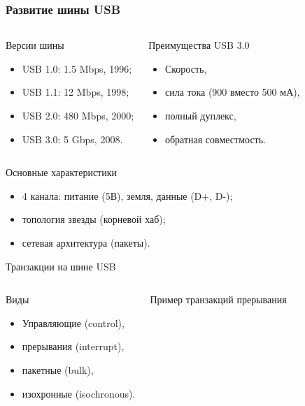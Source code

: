 \begin{frame}
\frametitle{Развитие шины USB}

\begin{columns}
    \column{5cm}

    \begin{block}{Версии шины}
    \begin{itemize}
        \item USB 1.0: 1.5 Mbps, 1996;
        \item USB 1.1: 12 Mbps, 1998;
        \item USB 2.0: 480 Mbps, 2000;
        \item USB 3.0: 5 Gbps, 2008.
    \end{itemize}
    \end{block}

    \column{6cm}
    \pause
    \begin{block}{Преимущества USB 3.0}
    \begin{itemize}
        \item Скорость,
        \item сила тока (900 вместо 500 мА),
        \item полный дуплекс,
        \item обратная совместмость.
    \end{itemize}
    \end{block}
\end{columns}

\pause

\begin{block}{Основные характеристики}
\begin{itemize}
    \item 4 канала: питание (5В), земля, данные (D+, D-);
    \item топология звезды (корневой хаб);
    \item сетевая архитектура (пакеты).
\end{itemize}
\end{block}
\end{frame}

\begin{frame}{Транзакции на шине USB}
\begin{columns}
    \pause
    \column{4.8cm}
    \begin{block}{Виды}
    \begin{itemize}
        \item Управляющие (control),
        \item прерывания (interrupt),
        \item пакетные (bulk),
        \item изохронные (isochronous).
    \end{itemize}
    \end{block}

    \pause
    \column{6.7cm}
    \centering
    Пример транзакций прерывания


\end{columns}
\end{frame}

